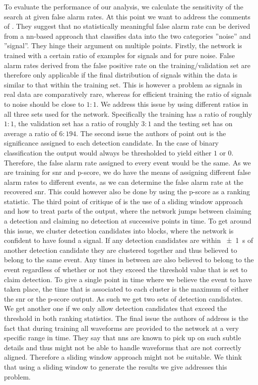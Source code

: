 To evaluate the performance of our analysis, we calculate the sensitivity of the search at given false alarm rates. At this point we want to address the comments of \cite{cnn_magiacal_bullet}. They suggest that no statistically meaningful false alarm rate can be derived from a \gls{nn}-based approach that classifies data into the two categories ''noise'' and ''signal''. They hinge their argument on multiple points. Firstly, the network is trained with a certain ratio of examples for signals and for pure noise. False alarm rates derived from the false positive rate on the training/validation set are therefore only applicable if the final distribution of signals within the data is similar to that within the training set. This is however a problem as signals in real data are comparatively rare, whereas for efficient training the ratio of signals to noise should be close to $1:1$. We address this issue by using different ratios in all three sets used for the network. Specifically the training has a ratio of roughly $1:1$, the validation set has a ratio of roughly $3:1$ and the testing set has on average a ratio of $6:194$. The second issue the authors of \cite{cnn_magiacal_bullet} point out is the significance assigned to each detection candidate. In the case of binary classification the output would always be thresholded to yield either $1$ or $0$. Therefore, the false alarm rate assigned to every event would be the same. As we are training for \gls{snr} and p-score, we do have the means of assigning different false alarm rates to different events, as we can determine the false alarm rate at the recovered \gls{snr}. This could however also be done by using the p-score as a ranking statistic. The third point of critique of \cite{cnn_magiacal_bullet} is the use of a sliding window approach and how to treat parts of the output, where the network jumps between claiming a detection and claiming no detection at successive points in time. To get around this issue, we cluster detection candidates into blocks, where the network is confident to have found a signal. If any detection candidates are within \SI{\pm 1}{\s} of another detection candidate they are clustered together and thus believed to belong to the same event. Any times in between are also believed to belong to the event regardless of whether or not they exceed the threshold value that is set to claim detection. To give a single point in time where we believe the event to have taken place, the time that is associated to each cluster is the maximum of either the \gls{snr} or the p-score output. As such we get two sets of detection candidates. We get another one if we only allow detection candidates that exceed the threshold in both ranking statistics. The final issue the authors of \cite{cnn_magiacal_bullet} address is the fact that during training all waveforms are provided to the network at a very specific range in time. They say that \gls{nn}s are known to pick up on such subtle details and thus might not be able to handle waveforms that are not correctly aligned. Therefore a sliding window approach might not be suitable. We think that using a sliding window to generate the results we give addresses this problem.\smallskip\\

